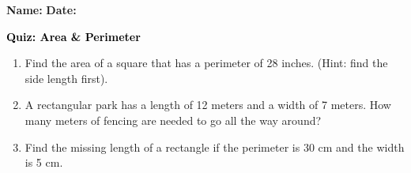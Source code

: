 \documentclass[12pt, letterpaper, fleqn]{article}
\begin{document}
\textbf{Name:} \underline{\hspace{5cm}}
\hfill
\textbf{Date:} \underline{\hspace{3cm}}\\

\begin{tcolorbox}[colback=customteal!20]
    \large\textcolor{black}{\textbf{Quiz: Area \& Perimeter}}
\end{tcolorbox}
\begin{enumerate}[itemsep=3.5cm, leftmargin=0.6cm]
\item Find the area of a square that has a perimeter of 28 inches. (Hint: find the side length first).
\vspace{3.5cm}
\item A rectangular park has a length of 12 meters and a width of 7 meters. How many meters of fencing are needed to go all the way around?
\vspace{3.5cm}
\item Find the missing length of a rectangle if the perimeter is 30 cm and the width is 5 cm.
\end{enumerate}
\end{document}
